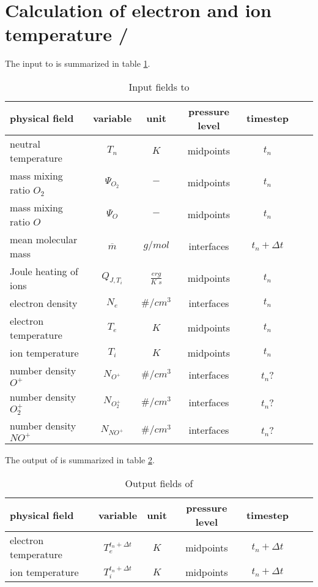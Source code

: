 %
\section{Calculation of electron and ion temperature / }\label{cap:settei}
%
The input to  is summarized in table
\ref{tab:input_settei}.
%
\begin{table}[tb]
\begin{tabular}{|p{3.5cm} ||c|c|c|c|c|c|} \hline
physical field               & variable        & unit&pressure
level& timestep
\\ \hline \hline
%
neutral temperature &       $T_n$              & $K$   &  midpoints & $t_n$\\
mass mixing ratio $O_2$&       {$\Psi_{O_2}$}     & $-$   & midpoints  & $t_n$\\
mass mixing ratio $O$&       {$\Psi_{O}$}     & $-$   &  midpoints & $t_n$\\
mean molecular mass&       {$\overline{m}$}     & $g/mol$   & interfaces  &$t_n + \Delta t$ \\
Joule heating of ions&       {$Q_{J,T_i}$}     & $\frac{erg}{K\; s}$   & midpoints  &  $t_n$\\
electron density &       $N_e$              & $\#/cm^3$   &  interfaces & $t_n$\\
electron temperature &       $T_e$              & $K$   &  midpoints & $t_n$\\
ion temperature &       $T_i$              & $K$   &  midpoints & $t_n$\\
number density $O^+$   &      $N_{O^+}$              & $\#/cm^3$   & interfaces & $t_n$?\\
number density $O_2^+$ &      $N_{O_2^+}$            & $\#/cm^3$   & interfaces & $t_n$?\\
number density $NO^+$  &      $N_{NO^+}$             & $\#/cm^3$   &
interfaces& $t_n$?
\\ \hline \hline
\end{tabular}
\caption{Input fields to }
\label{tab:input_settei}
\end{table}
%
The output of  is summarized in table
\ref{tab:output_settei}.
%
\begin{table}[tb]
\begin{tabular}{|p{3.5cm} ||c|c|c|c|c|c|} \hline
physical field               & variable        & unit&pressure
level& timestep \\ \hline \hline
electron temperature    &       {$T_e^{t_n+\Delta t}$}     & $K$   & midpoints  & $t_n+\Delta t$ \\
ion temperature     &       {$T_i^{t_n+\Delta t}$}     & $K$   &
midpoints & $t_n+\Delta t$
\\ \hline \hline
\end{tabular}
\caption{Output fields of }
\label{tab:output_settei}
\end{table}
